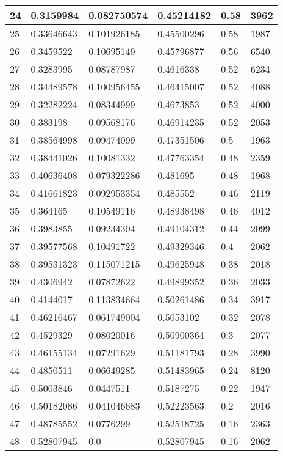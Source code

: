 \begin{longtable}{|l|l|l|l|l|l|}
24 & 0.3159984 & 0.082750574 & 0.45214182 & 0.58 & 3962 \\ \hline 
25 & 0.33646643 & 0.101926185 & 0.45500296 & 0.58 & 1987 \\ \hline 
26 & 0.3459522 & 0.10695149 & 0.45796877 & 0.56 & 6540 \\ \hline 
27 & 0.3283995 & 0.08787987 & 0.4616338 & 0.52 & 6234 \\ \hline 
28 & 0.34489578 & 0.100956455 & 0.46415007 & 0.52 & 4088 \\ \hline 
29 & 0.32282224 & 0.08344999 & 0.4673853 & 0.52 & 4000 \\ \hline 
30 & 0.383198 & 0.09568176 & 0.46914235 & 0.52 & 2053 \\ \hline 
31 & 0.38564998 & 0.09474099 & 0.47351506 & 0.5 & 1963 \\ \hline 
32 & 0.38441026 & 0.10081332 & 0.47763354 & 0.48 & 2359 \\ \hline 
33 & 0.40636408 & 0.079322286 & 0.481695 & 0.48 & 1968 \\ \hline 
34 & 0.41661823 & 0.092953354 & 0.485552 & 0.46 & 2119 \\ \hline 
35 & 0.364165 & 0.10549116 & 0.48938498 & 0.46 & 4012 \\ \hline 
36 & 0.3983855 & 0.09234304 & 0.49104312 & 0.44 & 2099 \\ \hline 
37 & 0.39577568 & 0.10491722 & 0.49329346 & 0.4 & 2062 \\ \hline 
38 & 0.39531323 & 0.115071215 & 0.49625948 & 0.38 & 2018 \\ \hline 
39 & 0.4306942 & 0.07872622 & 0.49899352 & 0.36 & 2033 \\ \hline 
40 & 0.4144017 & 0.113834664 & 0.50261486 & 0.34 & 3917 \\ \hline 
41 & 0.46216467 & 0.061749004 & 0.5053102 & 0.32 & 2078 \\ \hline 
42 & 0.4529329 & 0.08020016 & 0.50900364 & 0.3 & 2077 \\ \hline 
43 & 0.46155134 & 0.07291629 & 0.51181793 & 0.28 & 3990 \\ \hline 
44 & 0.4850511 & 0.06649285 & 0.51483965 & 0.24 & 8120 \\ \hline 
45 & 0.5003846 & 0.0447511 & 0.5187275 & 0.22 & 1947 \\ \hline 
46 & 0.50182086 & 0.041046683 & 0.52223563 & 0.2 & 2016 \\ \hline 
47 & 0.48785552 & 0.0776299 & 0.52518725 & 0.16 & 2363 \\ \hline 
48 & 0.52807945 & 0.0 & 0.52807945 & 0.16 & 2062 \\ \hline 

\end{longtable}
